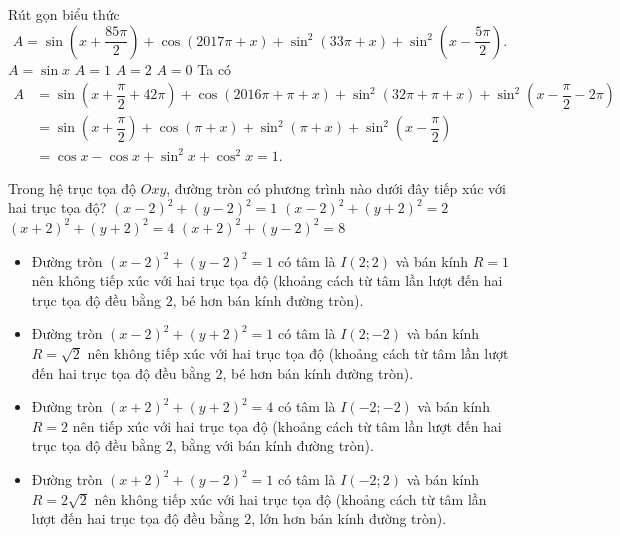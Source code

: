 \begin{ex}%
	Rút gọn biểu thức $$A=\sin\left( x+\dfrac{85\pi}{2}\right)+\cos \left(2017\pi+x \right)+\sin^2 \left(33\pi+x \right)+\sin^2\left( x-\dfrac{5\pi}{2}\right).$$
	\choice
	{$A=\sin x$}
	{\True  $A=1$}
	{$A=2$}
	{$A=0$}
	\loigiai
	{
		Ta có $$\begin{aligned} A&=\sin \left(x+\dfrac{\pi}{2}+42\pi \right)+\cos \left(2016\pi+\pi+x \right)+\sin^2 \left(32\pi+\pi+x \right)+\sin^2 \left(x-\dfrac{\pi}{2}-2\pi \right) \\&=\sin \left(x+\dfrac{\pi}{2} \right)+\cos \left(\pi+x\right)+\sin^2(\pi+x)+\sin^2 \left(x-\dfrac{\pi}{2} \right)\\ &=\cos x-\cos x+\sin^2 x+\cos^2 x=1.\end{aligned}$$
	}
\end{ex}
\begin{ex}%
	Trong hệ trục tọa độ $Oxy$, đường tròn có phương trình nào dưới đây tiếp xúc với hai trục tọa độ?
	\choice
	{$(x-2)^2+(y-2)^2=1$}
	{$(x-2)^2+(y+2)^2=2$}
	{\True $(x+2)^2+(y+2)^2=4$}
	{$(x+2)^2+(y-2)^2=8$}
	\loigiai
	{
		\begin{itemize}
			\item Đường tròn $(x-2)^2+(y-2)^2=1$ có tâm là $I(2;2)$ và bán kính $R=1$ nên không tiếp xúc với hai trục tọa độ (khoảng cách từ tâm lần lượt đến hai trục tọa độ đều bằng $2$, bé hơn bán kính đường tròn).
			\item Đường tròn $(x-2)^2+(y+2)^2=1$ có tâm là $I(2;-2)$ và bán kính $R=\sqrt{2}$ nên không tiếp xúc với hai trục tọa độ (khoảng cách từ tâm lần lượt đến hai trục tọa độ đều bằng $2$, bé hơn bán kính đường tròn).
			\item Đường tròn $(x+2)^2+(y+2)^2=4$ có tâm là $I(-2;-2)$ và bán kính $R=2$ nên tiếp xúc với hai trục tọa độ (khoảng cách từ tâm lần lượt đến hai trục tọa độ đều bằng $2$, bằng với bán kính đường tròn).
			\item Đường tròn $(x+2)^2+(y-2)^2=1$ có tâm là $I(-2;2)$ và bán kính $R=2\sqrt{2}$ nên không tiếp xúc với hai trục tọa độ (khoảng cách từ tâm lần lượt đến hai trục tọa độ đều bằng $2$, lớn hơn bán kính đường tròn).
		\end{itemize}
	}
\end{ex}
